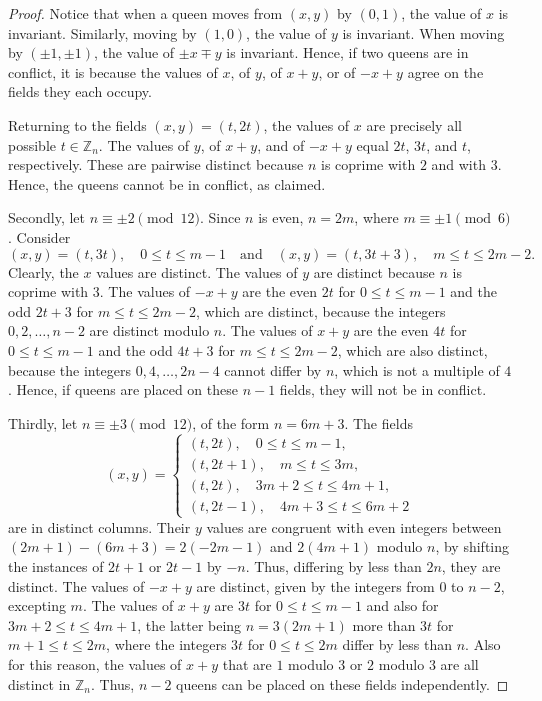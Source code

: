 \documentclass[11pt]{article}
\begin{document}
\begin{proof}
Notice that when a queen moves from $(x,y)$ by $(0,1)$, the value of $x$ is invariant. Similarly, moving by $(1,0)$, the value of $y$ is invariant. When moving by $(\pm 1,\pm 1)$, the value of $\pm x \mp y$ is invariant. Hence, if two queens are in conflict, it is because the values of $x$, of $y$, of $x+y$, or of $-x+y$ agree on the fields they each occupy.

Returning to the fields $(x,y)=(t,2t)$, the values of $x$ are precisely all possible $t\in \mathbb{Z}_n$. The values of $y$, of $x+y$, and of $-x+y$ equal $2t$, $3t$, and $t$, respectively. These are pairwise distinct because $n$ is coprime with $2$ and with $3$. Hence, the queens cannot be in conflict, as claimed.

Secondly, let $n\equiv \pm 2 \pmod{12}$. Since $n$ is even, $n=2m$, where $m\equiv \pm 1 \pmod 6$. Consider
$$(x,y)=(t,3t),\quad 0\le t\le m-1\quad \text{and} \quad (x,y)=(t,3t+3),\quad m\le t\le 2m-2.$$
Clearly, the $x$ values are distinct. The values of $y$ are distinct because $n$ is coprime with $3$. The values of $-x+y$ are the even $2t$ for $0\le t\le m-1$ and the odd $2t+3$ for $m\le t\le 2m-2$, which are distinct, because the integers $0,2,\dots,n-2$ are distinct modulo $n$. The values of $x+y$ are the even $4t$ for $0\le t\le m-1$ and the odd $4t+3$ for $m\le t\le 2m-2$, which are also distinct, because the integers $0,4,\dots,2n-4$ cannot differ by $n$, which is not a multiple of $4$. Hence, if queens are placed on these $n-1$ fields, they will not be in conflict.

Thirdly, let $n\equiv \pm 3 \pmod{12}$, of the form $n=6m+3$. The fields
$$(x,y)=\begin{cases}
    (t,2t),\quad 0\le t\le m-1, \\
    (t,2t+1),\quad m\le t\le 3m, \\
    (t,2t),\quad 3m+2\le t\le 4m+1, \\
    (t,2t-1),\quad 4m+3\le t\le 6m+2
\end{cases}$$
are in distinct columns. Their $y$ values are congruent with even integers between $(2m+1)-(6m+3)=2(-2m-1)$ and $2(4m+1)$ modulo $n$, by shifting the instances of $2t+1$ or $2t-1$ by $-n$. Thus, differing by less than $2n$, they are distinct. The values of $-x+y$ are distinct, given by the integers from $0$ to $n-2$, excepting $m$. The values of $x+y$ are $3t$ for $0\le t\le m-1$ and also for $3m+2\le t\le 4m+1$, the latter being $n=3(2m+1)$ more than $3t$ for $m+1\le t\le 2m$, where the integers $3t$ for $0\le t\le 2m$ differ by less than $n$. Also for this reason, the values of $x+y$ that are $1$ modulo $3$ or $2$ modulo $3$ are all distinct in $\mathbb{Z}_n$. Thus, $n-2$ queens can be placed on these fields independently.


\end{proof}
\end{document}

